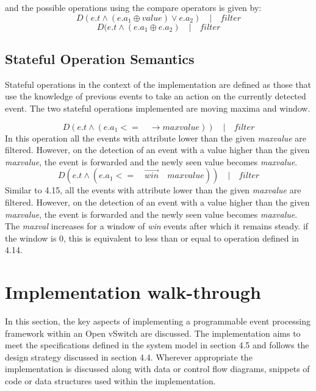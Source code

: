 and the possible operations using the compare operators is given by:
\begin{equation}
D(e.t  \wedge (e.a_1 \oplus value) \vee e.a_2) \quad | \quad filter
\end{equation}
\begin{equation}
D(e.t  \wedge (e.a_1 \oplus e.a_2) \quad | \quad filter
\end{equation}
\subsection{Stateful Operation Semantics}
Stateful operations in the context of the implementation are defined as those that use the knowledge of previous events to take an action on the currently detected event. The two stateful operations implemented are moving maxima and window.

\begin{equation}
D(e.t  \wedge (e.a_1  <=\quad \rightarrow maxvalue) ) \quad | \quad filter
\end{equation}
In this operation all the events with attribute lower than the given \textit{maxvalue} are filtered. However, on the detection of an event with a value higher than the given \textit{maxvalue}, the event is forwarded and the newly seen value becomes \textit{maxvalue}.
\begin{equation}
D(e.t  \wedge (e.a_1  <=\quad \overrightarrow{win} \quad maxvalue)) \quad | \quad filter
\end{equation}
Similar to 4.15,  all the events with attribute lower than the given \textit{maxvalue} are filtered. However, on the detection of an event with a value higher than the given \textit{maxvalue}, the event is forwarded and the newly seen value becomes \textit{maxvalue}. The \textit{maxval} increases for a window of \textit{win} events after which it remains steady. if the window is 0, this is equivalent to less than or equal to operation defined in 4.14.

\section{Implementation walk-through}
In this section, the key aspects of implementing a programmable event processing framework within an Open vSwitch are discussed. The implementation aims to meet the specifications defined in the system model in section 4.5 and follows the design strategy discussed in section 4.4. Wherever appropriate the implementation is discussed along with data or control flow diagrams, snippets of code or data structures used within the implementation.

